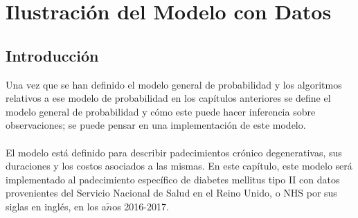 \chapter{Ilustraci\'on del Modelo con Datos}
\section{Introducci\'on}
Una vez que se han definido el modelo general de probabilidad y los algoritmos relativos a ese modelo de probabilidad en los cap\'itulos anteriores se define el modelo general de probabilidad y c\'omo este puede hacer inferencia sobre observaciones; se puede pensar en una implementaci\'on de este modelo.\\
\\
El modelo est\'a definido para describir padecimientos cr\'onico degenerativas, sus duraciones y los costos asociados a las mismas. En este cap\'itulo, este modelo ser\'a implementado al padecimiento espec\'ifico de diabetes mellitus tipo II con datos provenientes del Servicio Nacional de Salud en el Reino Unido, o NHS por sus siglas en ingl\'es, en los a$\tilde{n}$os 2016-2017.\\
